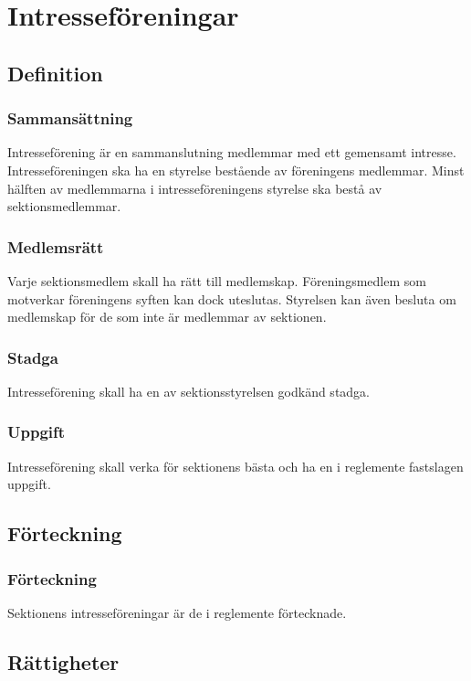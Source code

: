 \section{Intresseföreningar}

\subsection{Definition}

\subsubsection{Sammansättning}
Intresseförening är en sammanslutning medlemmar med ett gemensamt intresse. Intresseföreningen ska ha en styrelse bestående av föreningens medlemmar. Minst hälften av medlemmarna i intresseföreningens styrelse ska bestå av sektionsmedlemmar.

\subsubsection{Medlemsrätt}
Varje sektionsmedlem skall ha rätt till medlemskap. Föreningsmedlem som motverkar föreningens syften kan dock uteslutas. Styrelsen kan även besluta om medlemskap för de som inte är medlemmar av sektionen.

\subsubsection{Stadga}
Intresseförening skall ha en av sektionsstyrelsen godkänd stadga.

\subsubsection{Uppgift}
Intresseförening skall verka för sektionens bästa och ha en i reglemente fastslagen uppgift.

\subsection{Förteckning}

\subsubsection{Förteckning}
Sektionens intresseföreningar är de i reglemente förtecknade.

\subsection{Rättigheter}

